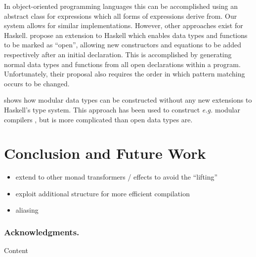 \documentclass[runningheads,a4paper]{llncs}
\begin{document}
In object-oriented programming languages this can be accomplished using an abstract class for expressions which all forms of expressions derive from. Our system allows for similar implementations. However, other approaches exist for Haskell. \cite{loh2006open} propose an extension to Haskell which enables data types and functions to be marked as ``open'', allowing new constructors and equations to be added respectively after an initial declaration. This is accomplished by generating normal data types and functions from all open declarations within a program. Unfortunately, their proposal also requires the order in which pattern matching occurs to be changed.

\cite{swierstra2008data} shows how modular data types can be constructed without any new extensions to Haskell's type system. This approach has been used to construct \emph{e.g.} modular compilers \cite{day2012towards}, but is more complicated than open data types are. 

\section{Conclusion and Future Work}
\label{sec:conclusions}

\begin{itemize}
\item extend to other monad transformers / effects to avoid the ``lifting''
\item exploit additional structure for more efficient compilation 
\item aliasing 
\end{itemize}

\subsubsection*{Acknowledgments.} Content
\end{document}
